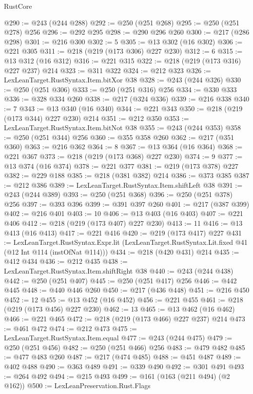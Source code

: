\begin{lexlean}{RustCore}
\begin{coremodule}
{\begin{coremodule}
{{{{{@290 := @243 (@244 @288)
@292 := @250 (@251 @268)
@295 := @250 (@251 @278) @256
@296 := @292 @295
@298 := @290 @296 @260
@300 := @217 (@286 @298)
@301 := @216 @300
@302 := 5
@305 := @13 @302 (@16 @302)
@306 := @221 @305
@311 := @218 (@219 (@173 @306) @227 @230)
@312 := 6
@315 := @13 @312 (@16 @312)
@316 := @221 @315
@322 := @218 (@219 (@173 @316) @227 @237) @214
@323 := @311 @322
@324 := @212 @323
@326 := LexLeanTarget.RustSyntax.Item.bitXor @38
@328 := @243 (@244 @326)
@330 := @250 (@251 @306)
@333 := @250 (@251 @316) @256
@334 := @330 @333
@336 := @328 @334 @260
@338 := @217 (@324 @336)
@339 := @216 @338
@340 := 7
@343 := @13 @340 (@16 @340)
@344 := @221 @343
@350 := @218 (@219 (@173 @344) @227 @230) @214
@351 := @212 @350
@353 := LexLeanTarget.RustSyntax.Item.bitNot @38
@355 := @243 (@244 @353)
@358 := @250 (@251 @344) @256
@360 := @355 @358 @260
@362 := @217 (@351 @360)
@363 := @216 @362
@364 := 8
@367 := @13 @364 (@16 @364)
@368 := @221 @367
@373 := @218 (@219 (@173 @368) @227 @230)
@374 := 9
@377 := @13 @374 (@16 @374)
@378 := @221 @377
@381 := @219 (@173 @378) @227
@382 := @229 @188
@385 := @218 (@381 @382) @214
@386 := @373 @385
@387 := @212 @386
@389 := LexLeanTarget.RustSyntax.Item.shiftLeft @38
@391 := @243 (@244 @389)
@393 := @250 (@251 @368)
@396 := @250 (@251 @378) @256
@397 := @393 @396
@399 := @391 @397 @260
@401 := @217 (@387 @399)
@402 := @216 @401
@403 := 10
@406 := @13 @403 (@16 @403)
@407 := @221 @406
@412 := @218 (@219 (@173 @407) @227 @230)
@413 := 11
@416 := @13 @413 (@16 @413)
@417 := @221 @416
@420 := @219 (@173 @417) @227
@431 := LexLeanTarget.RustSyntax.Expr.lit
    (LexLeanTarget.RustSyntax.Lit.fixed @41 (@12 Int @114 (instOfNat @114)))
@434 := @218 (@420 @431) @214
@435 := @412 @434
@436 := @212 @435
@438 := LexLeanTarget.RustSyntax.Item.shiftRight @38
@440 := @243 (@244 @438)
@442 := @250 (@251 @407)
@445 := @250 (@251 @417) @256
@446 := @442 @445
@448 := @440 @446 @260
@450 := @217 (@436 @448)
@451 := @216 @450
@452 := 12
@455 := @13 @452 (@16 @452)
@456 := @221 @455
@461 := @218 (@219 (@173 @456) @227 @230)
@462 := 13
@465 := @13 @462 (@16 @462)
@466 := @221 @465
@472 := @218 (@219 (@173 @466) @227 @237) @214
@473 := @461 @472
@474 := @212 @473
@475 := LexLeanTarget.RustSyntax.Item.equal
@477 := @243 (@244 @475)
@479 := @250 (@251 @456)
@482 := @250 (@251 @466) @256
@483 := @479 @482
@485 := @477 @483 @260
@487 := @217 (@474 @485)
@488 := @451 @487
@489 := @402 @488
@490 := @363 @489
@491 := @339 @490
@492 := @301 @491
@493 := @264 @492
@494 := @215 @493
@499 := @161 (@163 (@211 @494) (@2 @162))
@500 := LexLeanPreservation.Rust.Flags
}}}}}
\end{coremodule}}
\end{coremodule}
\end{lexlean}
